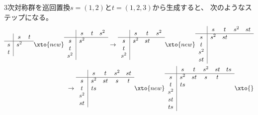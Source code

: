 	\begin{example}[三次対称群の生成]\label{eg:三次対称群の生成} %
		$3$次対称群を巡回置換$s=(1,2)$と$t=(1,2,3)$から生成すると、
		次のようなステップになる。
		\begin{equation*}\begin{split}
			\begin{array}{c|cc}
			& s & t\\ \hline
			s & s^2 \\
			t \\
			\end{array} \xto{new} \begin{array}{c|ccc}
			& s & t & s^2 \\ \hline
			s & s^2 \\
			t \\
			s^2 \\
			\end{array} \to \begin{array}{c|ccc}
			& s & t & s^2 \\ \hline
			s & s^2 & st \\
			t \\
			s^2 \\
			\end{array} \xto{new} \begin{array}{c|cccc}
			& s & t & s^2 & st \\ \hline
			s & s^2 & st \\
			t \\
			s^2 \\
			st \\
			\end{array} \\
			\to \begin{array}{c|ccccc}
			& s & t & s^2 & st \\ \hline
			s & s^2 & st & s & t \\
			t & ts \\
			s^2 \\
			st \\
			\end{array} \xto{new} \begin{array}{c|ccccc}
			& s & t & s^2 & st & ts \\ \hline
			s & s^2 & st & s & t \\
			t & ts \\
			s^2 \\
			st \\
			ts \\
			\end{array} \xto{} \begin{array}{c|ccccc}

\end{array}
\end{split}
\end{equation*}
\end{example}
